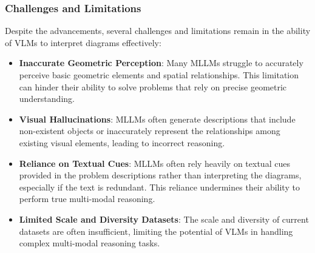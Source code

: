 
\subsubsection{Challenges and Limitations}
Despite the advancements, several challenges and limitations remain in the ability of VLMs to interpret diagrams effectively:
\begin{itemize}
    \item \textbf{Inaccurate Geometric Perception}: Many MLLMs struggle to accurately perceive basic geometric elements and spatial relationships. This limitation can hinder their ability to solve problems that rely on precise geometric understanding\cite{li2024eagle}.
    \item \textbf{Visual Hallucinations}: MLLMs often generate descriptions that include non-existent objects or inaccurately represent the relationships among existing visual elements, leading to incorrect reasoning\cite{islam2024large}\cite{li2024eagle}\cite{zhang2025mathverse}.
    \item \textbf{Reliance on Textual Cues}: MLLMs often rely heavily on textual cues provided in the problem descriptions rather than interpreting the diagrams, especially if the text is redundant\cite{zhang2025mathverse}\cite{he2024distill}. This reliance undermines their ability to perform true multi-modal reasoning.
    \item \textbf{Limited Scale and Diversity Datasets}: The scale and diversity of current datasets are often insufficient, limiting the potential of VLMs in handling complex multi-modal reasoning tasks\cite{zhang2024mavis}\cite{he2024distill}.

\end{itemize}